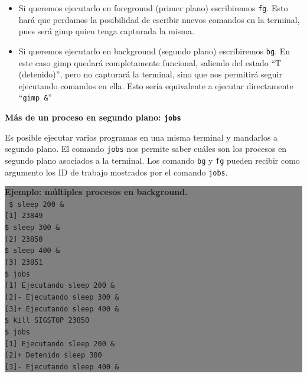 \documentclass[12pt]{article}
\begin{document}
\begin{itemize}
\item Si queremos ejecutarlo en foreground  (primer plano) escribiremos 
\texttt{fg}.
Esto hará que perdamos la posibilidad de escribir nuevos comandos en la 
terminal, pues será gimp quien tenga capturada la misma. 

\item Si queremos ejecutarlo en background (segundo plano) escribiremos 
\texttt{bg}. En este caso gimp quedará completamente funcional, saliendo 
del estado ``T (detenido)'', pero no capturará la terminal, sino que 
nos permitirá seguir ejecutando comandos en ella. Esto sería equivalente
a ejecutar directamente ``\texttt{gimp \&}''
\end{itemize}

{\bf Más de un proceso en segundo plano: \texttt{jobs}}

Es posible ejecutar varios programas en una misma terminal y mandarlos a 
segundo plano. El comando \texttt{jobs} nos permite saber cuáles son los 
procesos en segundo plano asociados a la terminal. Los comando \texttt{bg}
y \texttt{fg} pueden recibir como argumento los ID de trabajo mostrados
por el comando \texttt{jobs}.


\colorbox{grey}{\parbox[t]{0.95\linewidth}{ \vspace*{0.5cm} { 
{\bf Ejemplo: múltiples procesos en background. }\\
{\tt
\$ sleep 200 \& \\
{[}1{]} 23849 \\
\$ sleep 300 \& \\
{[}2{]} 23850\\
\$ sleep 400 \& \\
{[}3{]} 23851 \\
\$ jobs \\
{[}1{]}   Ejecutando              sleep 200 \& \\
{[}2{]}-  Ejecutando              sleep 300 \& \\
{[}3{]}+  Ejecutando              sleep 400 \& \\
\$ kill \-SIGSTOP 23850 \\
\$ jobs \\
{[}1{]}   Ejecutando              sleep 200 \& \\
{[}2{]}+  Detenido                sleep 300 \\
{[}3{]}-  Ejecutando              sleep 400 \& \\
}
} \vspace*{0.5cm} } } 
\end{document}
